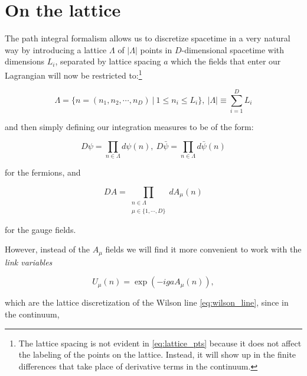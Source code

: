 \documentclass[11pt]{article}
\begin{document}
\section{On the lattice}

The path integral formalism allows us to discretize spacetime in a very natural way by introducing a lattice $\Lambda$ of $|\Lambda|$ points in $D$-dimensional spacetime with dimensions $L_i$, separated by lattice spacing $a$ which the fields that enter our Lagrangian will now be restricted to:\footnote{The lattice spacing is not evident in \eqref{eq:lattice_pts} because it does not affect the labeling of the points on the lattice. Instead, it will show up in the finite differences that take place of derivative terms in the continuum.}

\begin{equation}\label{eq:lattice_pts}\Lambda=\{n=(n_1,n_2,\cdots,n_D)\ |\ 1\leq n_i\leq L_i\},\ |\Lambda|\equiv \sum_{i=1}^DL_i\end{equation}

and then simply defining our integration measures to be of the form:

\begin{equation}\label{eq:fermion_lattice_measures}D\psi=\prod_{n\in\Lambda} d\psi(n),\ D\bar\psi=\prod_{n\in\Lambda} d\bar\psi(n)\end{equation}

for the fermions, and

\begin{equation}DA=\prod_{\substack{n\in\Lambda\\\mu\in\{1,\cdots,D\}}} dA_\mu(n)\end{equation}

for the gauge fields. 



However, instead of the $A_\mu$ fields we will find it more convenient to work with the \textit{link variables} 

\begin{equation}U_\mu(n)=\exp(-i g aA_\mu(n)),\end{equation}

which are the lattice discretization of the Wilson line \eqref{eq:wilson_line}, since in the continuum,
\end{document}
